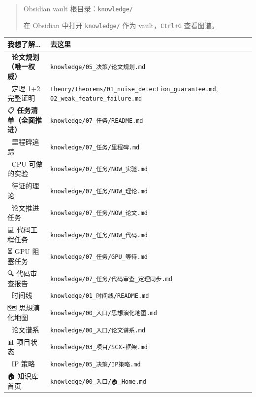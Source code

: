 \documentclass[
  12pt,
]{ctexart}
\begin{document}
\begin{quote}
Obsidian vault 根目录：\texttt{knowledge/}

在 Obsidian 中打开 \texttt{knowledge/} 作为 vault，\texttt{Ctrl+G}
查看图谱。
\end{quote}

\begin{longtable}[]{@{}
  >{\raggedright\arraybackslash}p{}
  >{\raggedright\arraybackslash}p{}@{}}
\toprule\noalign{}
\begin{minipage}[b]{\linewidth}\raggedright
我想了解\ldots{}
\end{minipage} & \begin{minipage}[b]{\linewidth}\raggedright
去这里
\end{minipage} \\
\midrule\noalign{}
\endhead
\bottomrule\noalign{}
\endlastfoot
📘 \textbf{论文规划（唯一权威）} &
\texttt{knowledge/05\_决策/论文规划.md} \\
🧮 定理 1+2 完整证明 &
\texttt{theory/theorems/01\_noise\_detection\_guarantee.md},
\texttt{02\_weak\_feature\_failure.md} \\
📋 \textbf{任务清单（全面推进）} &
\texttt{knowledge/07\_任务/README.md} \\
🎯 里程碑追踪 & \texttt{knowledge/07\_任务/里程碑.md} \\
🔬 CPU 可做的实验 & \texttt{knowledge/07\_任务/NOW\_实验.md} \\
🧮 待证的理论 & \texttt{knowledge/07\_任务/NOW\_理论.md} \\
📝 论文推进任务 & \texttt{knowledge/07\_任务/NOW\_论文.md} \\
💻 代码工程任务 & \texttt{knowledge/07\_任务/NOW\_代码.md} \\
⏳ GPU 阻塞任务 & \texttt{knowledge/07\_任务/GPU\_等待.md} \\
🔍 代码审查报告 & \texttt{knowledge/07\_任务/代码审查\_定理同步.md} \\
📅 时间线 & \texttt{knowledge/01\_时间线/README.md} \\
🗺️ 思想演化地图 & \texttt{knowledge/00\_入口/思想演化地图.md} \\
📖 论文谱系 & \texttt{knowledge/00\_入口/论文谱系.md} \\
📊 项目状态 & \texttt{knowledge/03\_项目/SCX-框架.md} \\
💼 IP 策略 & \texttt{knowledge/05\_决策/IP策略.md} \\
🏠 知识库首页 & \texttt{knowledge/00\_入口/🏠\_Home.md} \\
\end{longtable}
\end{document}
